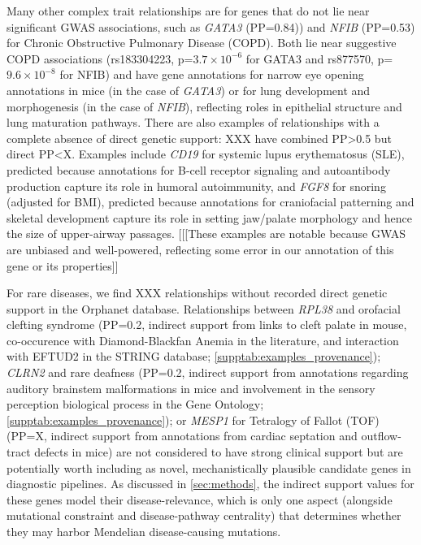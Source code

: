 \documentclass[sn-nature,lineno]{sn-jnl}%
\theoremstyle{thmstyleone}%
\theoremstyle{thmstyletwo}%
\theoremstyle{thmstylethree}%
\begin{document}
Many other complex trait relationships are for genes that do not lie near significant GWAS associations, such as \textit{GATA3} (PP=0.84)) and \textit{NFIB} (PP=0.53) for Chronic Obstructive Pulmonary Disease (COPD). Both lie near suggestive COPD associations (rs183304223, p=$3.7\times10^{-6}$ for GATA3 and rs877570, p=$9.6\times10^{-8}$ for NFIB) and have gene annotations for narrow eye opening annotations in mice\cite{kurek_transcriptome_2007} (in the case of \textit{GATA3}) or for lung development and morphogenesis\cite{abe_gata3_2021} (in the case of \textit{NFIB}), reflecting roles in epithelial structure and lung maturation pathways. There are also examples of relationships with a complete absence of direct genetic support: XXX have combined PP>0.5 but direct PP<X. Examples include \textit{CD19} for systemic lupus erythematosus (SLE), predicted because annotations for B-cell receptor signaling and autoantibody production capture its role in humoral autoimmunity\cite{mackensen_anti-cd19_2022}, and \textit{FGF8} for snoring (adjusted for BMI), predicted because annotations for craniofacial patterning and skeletal development capture its role in setting jaw/palate morphology\cite{zbasnik_fgf8_2022} and hence the size of upper-airway passages. [[[These examples are notable because GWAS are unbiased and well-powered, reflecting some error in our annotation of this gene or its properties]]

For rare diseases, we find XXX relationships without recorded direct genetic support in the Orphanet database. Relationships between \textit{RPL38} and orofacial clefting syndrome (PP=0.2, indirect support from links to cleft palate in mouse\cite{kondrashov_ribosome_2011}, co-occurence with Diamond-Blackfan Anemia in the literature, and interaction with EFTUD2 in the STRING database; \ref{supptab:examples_provenance}); \textit{CLRN2} and rare deafness (PP=0.2, indirect support from annotations regarding auditory brainstem malformations in mice\cite{mendia_clarin-2_2024} and involvement in the sensory perception biological process in the Gene Ontology;\ref{supptab:examples_provenance}); or {\it MESP1} for Tetralogy of Fallot (TOF) (PP=X, indirect support from annotations from cardiac septation and outflow-tract defects in mice\cite{lescroart_defining_2018}) are not considered to have strong clinical support but are potentially worth including as novel, mechanistically plausible candidate genes in diagnostic pipelines. As discussed in \ref{sec:methods}, the indirect support values for these genes model their disease-relevance, which is only one aspect (alongside mutational constraint and disease-pathway centrality) that determines whether they may harbor Mendelian disease-causing mutations.
\end{document}
